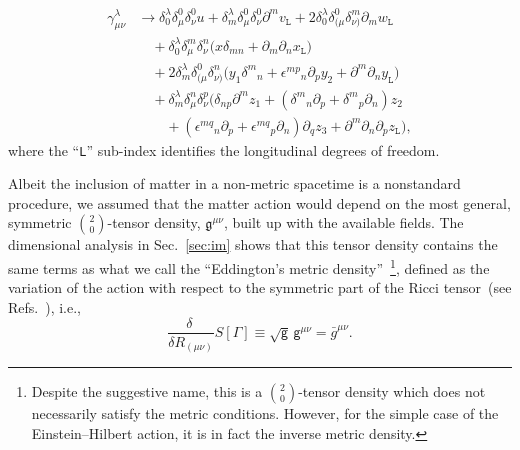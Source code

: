 \documentclass[aps,prd,12pt,twocolumn,superscriptaddress,showpacs,showkeys,reprint%
]{revtex4-1}
\renewcommand{\(}{\left(}
\renewcommand{\)}{\right)}
\renewcommand{\[}{\left[}
\renewcommand{\]}{\right]}
\newcommand{\hl}[1]{{\color{red} \bfseries{#1}}}
\begin{document}
\begin{equation}
  \begin{split}
    \gamma^\lambda_{\mu\nu}
    &\to
    \delta^\lambda_0\delta^0_\mu\delta^0_\nu u 
    + \delta^\lambda_m \delta^0_\mu\delta^0_\nu \partial^m v_{\mathtt{L}}
    + 2\delta^\lambda_0 \delta^0_{(\mu}\delta^m_{\nu)} \partial_m w_{\mathtt{L}}
    \\
    & \quad + \delta^\lambda_0 \delta^m_\mu\delta^n_\nu \Big(x \delta_{mn} + \partial_m \partial_n x_{\mathtt{L}}\Big)
    \\
    & \quad + 2\delta^\lambda_m \delta^0_{(\mu}\delta^n_{\nu)} \Big(y_1 \delta^m{}_n + \epsilon^{m p}{}_{n} \partial_p y_2 + \partial^m \partial_n y_{\mathtt{L}}\Big)
    \\
    & \quad + \delta^\lambda_m \delta^n_{\mu}\delta^p_{\nu} \Big(\delta_{n p} \partial^m z_1 + (\delta^m{}_n \partial_p+\delta^m{}_p \partial_n) z_2
    \\
    & \qquad +  (\epsilon^{m q}{}_n \partial_p+\epsilon^{m q}{}_p \partial_n) \partial_q z_3 + \partial^m \partial_n \partial_p z_{\mathtt{L}}\Big),
  \end{split}
\end{equation}
where the ``\texttt{L}'' sub-index identifies the longitudinal degrees of freedom.


Albeit the inclusion of matter in a non-metric spacetime is a nonstandard procedure, we assumed that the matter action would depend on the most general, symmetric $\binom{2}{0}$-tensor density, $\mathfrak{g}^{\mu \nu}$, built up with the available fields. The dimensional analysis in Sec.~\ref{sec:im} shows that this tensor density contains the same terms as what we call the ``Eddington's metric density''~\footnote{Despite the suggestive name, this is a $\binom{2}{0}$-tensor density which does not necessarily satisfy the metric conditions. However, for the simple case of the Einstein--Hilbert action, it is in fact the inverse metric density.}, defined as the variation of the action with respect to the symmetric part of the Ricci tensor~(see Refs.~\cite{Eddington1923math,schrodinger1950space,Poplawski:2012bw}), i.e.,%
\begin{equation}
  \label{metric}
  \frac{\delta\ }{\delta R_{(\mu\nu)}} S[\Gamma] \equiv \sqrt{\mathsf{g}} \, \mathsf{g}^{\mu\nu} = \bar{g}^{\mu\nu}.
\end{equation}
\end{document}
